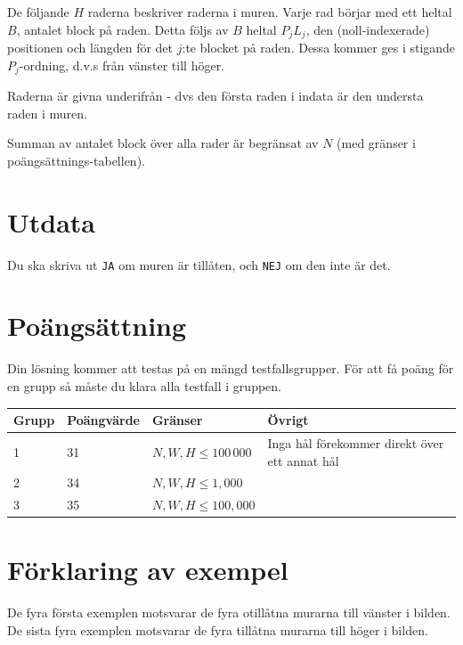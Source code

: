 De följande $H$ raderna beskriver raderna i muren.
Varje rad börjar med ett heltal $B$, antalet block på raden.
Detta följs av $B$ heltal $P_j L_j$, den (noll-indexerade) positionen och längden för det $j$:te blocket på raden. Dessa kommer ges i stigande $P_j$-ordning, d.v.s från vänster till höger.

Raderna är givna underifrån - dvs den första raden i indata är den understa raden i muren.

Summan av antalet block över alla rader är begränsat av $N$ (med gränser i poängsättnings-tabellen).

\section*{Utdata}
Du ska skriva ut \texttt{JA} om muren är tillåten, och \texttt{NEJ} om den inte är det.

\section*{Poängsättning}
Din lösning kommer att testas på en mängd testfallsgrupper. För att få poäng för en grupp
så måste du klara alla testfall i gruppen.

\begin{tabular}{| l | l | l | l |}
\hline
Grupp & Poängvärde & Gränser & Övrigt \\ \hline
1     & 31         & $N, W, H \le 100\,000$ & Inga hål förekommer direkt över ett annat hål \\ \hline
2     & 34         & $N, W, H \le 1,000$ & \\ \hline
3     & 35         & $N, W, H \le 100,000$ & \\ \hline
\end{tabular}

\section*{Förklaring av exempel}
De fyra första exemplen motsvarar de fyra otillåtna murarna till vänster i bilden.
De sista fyra exemplen motsvarar de fyra tillåtna murarna till höger i bilden.
